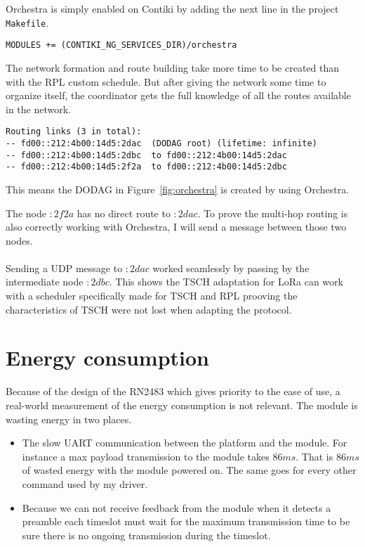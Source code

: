 Orchestra is simply enabled on Contiki by adding the next line in the project
\lstinline{Makefile}.

\begin{lstlisting}
MODULES += (CONTIKI_NG_SERVICES_DIR)/orchestra
\end{lstlisting}

The network formation and route building take more time to be created than with
the RPL custom schedule.
But after giving the network some time to organize itself, the coordinator gets
the full knowledge of all the routes available in the network.

\begin{lstlisting}
Routing links (3 in total):
-- fd00::212:4b00:14d5:2dac  (DODAG root) (lifetime: infinite)
-- fd00::212:4b00:14d5:2dbc  to fd00::212:4b00:14d5:2dac
-- fd00::212:4b00:14d5:2f2a  to fd00::212:4b00:14d5:2dbc
\end{lstlisting}

This means the DODAG in Figure~\ref{fig:orchestra} is created by using Orchestra.



The node $:2f2a$ has no direct route to $:2dac$.
To prove the multi-hop routing is also correctly working with Orchestra, I will
send a message between those two nodes.

\paragraph{}

Sending a UDP message to $:2dac$ worked seamlessly by passing by the
intermediate node $:2dbc$.
This shows the TSCH adaptation for LoRa can work with a scheduler specifically
made for TSCH and RPL prooving the characteristics of TSCH were not lost when
adapting the protocol.

\section{Energy consumption\label{section:energyconsumption}}

Because of the design of the RN2483 which gives priority to the ease of use,
a real-world measurement of the energy consumption is not relevant.
The module is wasting energy in two places.

\begin{itemize}
  \item The slow UART communication between the platform and the module. For
    instance a max payload transmission to the module takes $86 ms$.
    That is $86 ms$ of wasted energy with the module powered on. The same goes
    for every other command used by my driver.
  \item Because we can not receive feedback from the module when it detects a
    preamble each timeslot must wait for the maximum transmission time to be
    sure there is no ongoing transmission during the timeslot.
\end{itemize}

